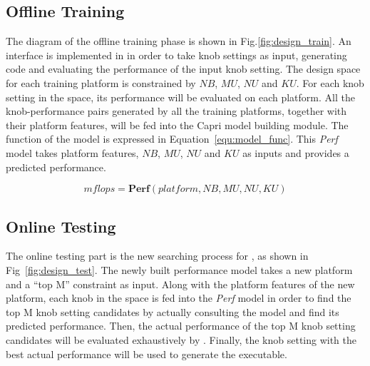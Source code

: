   \subsection{Offline Training}
  \label{sec:offline_training}
  The diagram of the offline training phase is shown in
  Fig.\ref{fig:design_train}. An interface is implemented in \atl in order to
  take knob settings as input, generating code and evaluating the performance of
  the input knob setting. The design space for each training platform is
  constrained by $NB$, $MU$, $NU$ and $KU$. For each knob setting in the space,
  its performance will be evaluated on each platform. All the knob-performance
  pairs generated by all the training platforms, together with their platform
  features, will be fed into the Capri model building module. The function of
  the model is expressed in Equation~\ref{equ:model_func}. This \emph{Perf}
  model takes platform features, $NB$, $MU$, $NU$ and $KU$ as inputs and
  provides a predicted performance.

  \begin{equation}
  \label{equ:model_func}
  mflops = \textbf{Perf}{(platform, NB, MU, NU, KU)}
  \end{equation}

  \subsection{Online Testing}
  \label{sec:online_testing}
  The online testing part is the new searching process for \atl, as shown in
  Fig~\ref{fig:design_test}. The newly built performance model takes a new
  platform and a ``top M'' constraint as input. Along with the platform
  features of the new platform, each knob in the space is fed into the
  \emph{Perf} model in order to find the
  top M knob setting candidates by actually consulting the model and find its
  predicted performance. Then, the actual performance of the top M
  knob setting candidates will be evaluated exhaustively by \atl. Finally,
  the knob setting with the best actual performance will be used to
  generate the executable.

